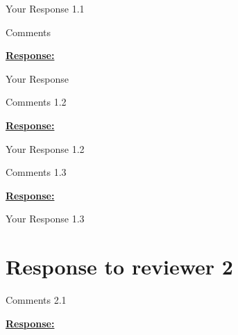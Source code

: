 \documentclass{article}
\begin{document}
Your Response 1.1

\vspace{0.3cm}


\begin{cmt*}{}{}        %

Comments

\end{cmt*}
\vspace{0.1cm}
\noindent
\underline{\textbf{Response:}}
\vspace{0.2cm}

Your Response 

\vspace{0.3cm}


\begin{cmt}{}{}

Comments 1.2

\end{cmt}
\vspace{0.1cm}
\noindent
\underline{\textbf{Response:}}
\vspace{0.2cm}

Your Response 1.2

\vspace{0.3cm}


\begin{cmt}{}{}

Comments 1.3

\end{cmt}
\vspace{0.1cm}
\noindent
\underline{\textbf{Response:}}
\vspace{0.2cm}

Your Response 1.3

\vspace{0.3cm}



\newpage
\section{Response to reviewer 2}

\begin{cmt}{}{}

Comments 2.1

\end{cmt}
\vspace{0.1cm}
\noindent
\underline{\textbf{Response:}}
\vspace{0.2cm}
\end{document}
